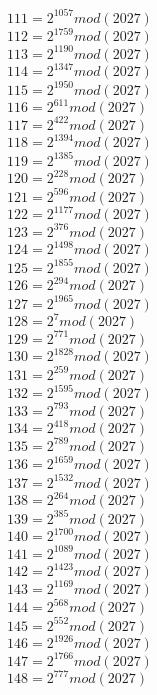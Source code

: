 \documentclass[12pt, letterpaper]{article}
\begin{document}
\begin{itemize}
\begin{multicols}{3}
$111= 2^{1057} mod (2027)$\\
$112= 2^{1759} mod (2027)$\\
$113= 2^{1190} mod (2027)$\\
$114= 2^{1347} mod (2027)$\\
$115= 2^{1950} mod (2027)$\\
$116= 2^{611} mod (2027)$\\
$117= 2^{422} mod (2027)$\\
$118= 2^{1394} mod (2027)$\\
$119= 2^{1385} mod (2027)$\\
$120= 2^{228} mod (2027)$\\
$121= 2^{596} mod (2027)$\\
$122= 2^{1177} mod (2027)$\\
$123= 2^{376} mod (2027)$\\
$124= 2^{1498} mod (2027)$\\
$125= 2^{1855} mod (2027)$\\
$126= 2^{294} mod (2027)$\\
$127= 2^{1965} mod (2027)$\\
$128= 2^{7} mod (2027)$\\
$129= 2^{771} mod (2027)$\\
$130= 2^{1828} mod (2027)$\\
$131= 2^{259} mod (2027)$\\
$132= 2^{1595} mod (2027)$\\
$133= 2^{793} mod (2027)$\\
$134= 2^{418} mod (2027)$\\
$135= 2^{789} mod (2027)$\\
$136= 2^{1659} mod (2027)$\\
$137= 2^{1532} mod (2027)$\\
$138= 2^{264} mod (2027)$\\
$139= 2^{385} mod (2027)$\\
$140= 2^{1700} mod (2027)$\\
$141= 2^{1089} mod (2027)$\\
$142= 2^{1423} mod (2027)$\\
$143= 2^{1169} mod (2027)$\\
$144= 2^{568} mod (2027)$\\
$145= 2^{552} mod (2027)$\\
$146= 2^{1926} mod (2027)$\\
$147= 2^{1766} mod (2027)$\\
$148= 2^{777} mod (2027)$\\

\end{multicols}
\end{itemize}
\end{document}
